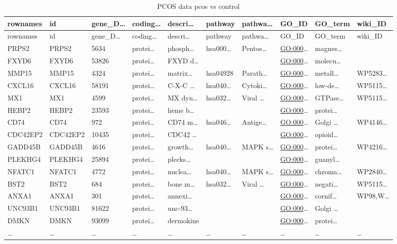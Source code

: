 \documentclass[
]{article}
\begin{document}
\begin{longtable}[]{@{}llllllllll@{}}
\caption{\label{tab:PCOS-data-pcos-vs-control}PCOS data pcos vs control}\tabularnewline
\toprule
rownames & id & gene\_D\ldots{} & coding\ldots{} & descri\ldots{} & pathway & pathwa\ldots{} & GO\_ID & GO\_term & wiki\_ID\tabularnewline
\midrule
\endfirsthead
\toprule
rownames & id & gene\_D\ldots{} & coding\ldots{} & descri\ldots{} & pathway & pathwa\ldots{} & GO\_ID & GO\_term & wiki\_ID\tabularnewline
\midrule
\endhead
PRPS2 & PRPS2 & 5634 & protei\ldots{} & phosph\ldots{} & hsa000\ldots{} & Pentos\ldots{} & \url{GO:000}\ldots{} & magnes\ldots{} &\tabularnewline
FXYD6 & FXYD6 & 53826 & protei\ldots{} & FXYD d\ldots{} & & & \url{GO:000}\ldots{} & molecu\ldots{} &\tabularnewline
MMP15 & MMP15 & 4324 & protei\ldots{} & matrix\ldots{} & hsa04928 & Parath\ldots{} & \url{GO:000}\ldots{} & metall\ldots{} & WP5283\ldots{}\tabularnewline
CXCL16 & CXCL16 & 58191 & protei\ldots{} & C-X-C \ldots{} & hsa040\ldots{} & Cytoki\ldots{} & \url{GO:000}\ldots{} & low-de\ldots{} & WP5115\ldots{}\tabularnewline
MX1 & MX1 & 4599 & protei\ldots{} & MX dyn\ldots{} & hsa032\ldots{} & Viral \ldots{} & \url{GO:000}\ldots{} & GTPase\ldots{} & WP5115\ldots{}\tabularnewline
HEBP2 & HEBP2 & 23593 & protei\ldots{} & heme b\ldots{} & & & \url{GO:000}\ldots{} & protei\ldots{} &\tabularnewline
CD74 & CD74 & 972 & protei\ldots{} & CD74 m\ldots{} & hsa046\ldots{} & Antige\ldots{} & \url{GO:000}\ldots{} & Golgi \ldots{} & WP4146\ldots{}\tabularnewline
CDC42EP2 & CDC42EP2 & 10435 & protei\ldots{} & CDC42 \ldots{} & & & \url{GO:000}\ldots{} & opioid\ldots{} &\tabularnewline
GADD45B & GADD45B & 4616 & protei\ldots{} & growth\ldots{} & hsa040\ldots{} & MAPK s\ldots{} & \url{GO:000}\ldots{} & protei\ldots{} & WP4216\ldots{}\tabularnewline
PLEKHG4 & PLEKHG4 & 25894 & protei\ldots{} & plecks\ldots{} & & & \url{GO:000}\ldots{} & guanyl\ldots{} &\tabularnewline
NFATC1 & NFATC1 & 4772 & protei\ldots{} & nuclea\ldots{} & hsa040\ldots{} & MAPK s\ldots{} & \url{GO:000}\ldots{} & chroma\ldots{} & WP2840\ldots{}\tabularnewline
BST2 & BST2 & 684 & protei\ldots{} & bone m\ldots{} & hsa032\ldots{} & Viral \ldots{} & \url{GO:000}\ldots{} & negati\ldots{} & WP5115\ldots{}\tabularnewline
ANXA1 & ANXA1 & 301 & protei\ldots{} & annexi\ldots{} & & & \url{GO:000}\ldots{} & cornif\ldots{} & WP98,W\ldots{}\tabularnewline
UNC93B1 & UNC93B1 & 81622 & protei\ldots{} & unc-93\ldots{} & & & \url{GO:000}\ldots{} & Golgi \ldots{} &\tabularnewline
DMKN & DMKN & 93099 & protei\ldots{} & dermokine & & & \url{GO:000}\ldots{} & protei\ldots{} &\tabularnewline
\ldots{} & \ldots{} & \ldots{} & \ldots{} & \ldots{} & \ldots{} & \ldots{} & \ldots{} & \ldots{} & \ldots{}\tabularnewline
\bottomrule
\end{longtable}
\end{document}
